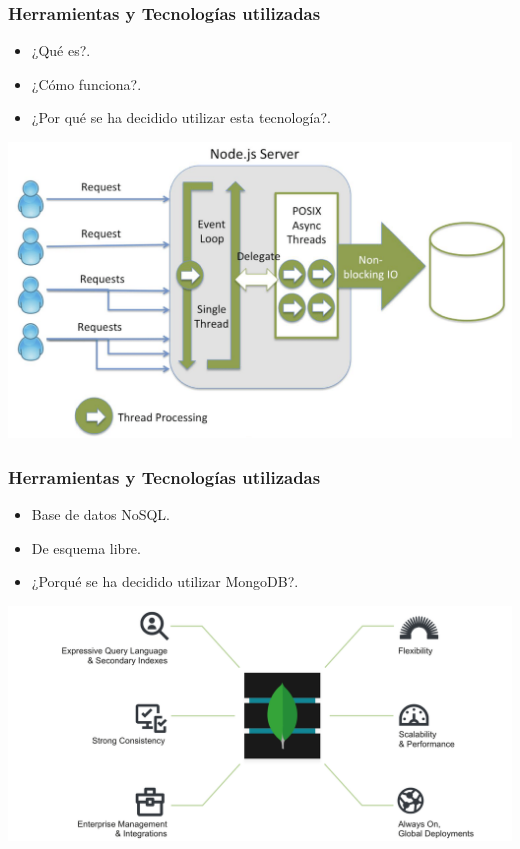 \begin{frame}
	\frametitle{Herramientas y Tecnologías utilizadas}
			\begin{itemize}
				\item {¿Qué es?}.
				\item {¿Cómo funciona?}.
				\item {¿Por qué se ha decidido utilizar esta tecnología?}.
			\end{itemize}
		\endblock{}
		\vfill 
			\begin{center}
				\includegraphics[width=0.72\linewidth]{Images/nodejsEx}
			\end{center}
\end{frame}

\begin{frame}
	\frametitle{Herramientas y Tecnologías utilizadas}
			\begin{itemize}
				\item {Base de datos NoSQL}.
				\item {De esquema libre}.
				\item {¿Porqué se ha decidido utilizar MongoDB?}.
			\end{itemize}
		\endblock{}
		\vfill 
		\begin{center}
			\includegraphics[width=0.88\linewidth]{Images/mongodb-architecture}
		\end{center}
\end{frame}

